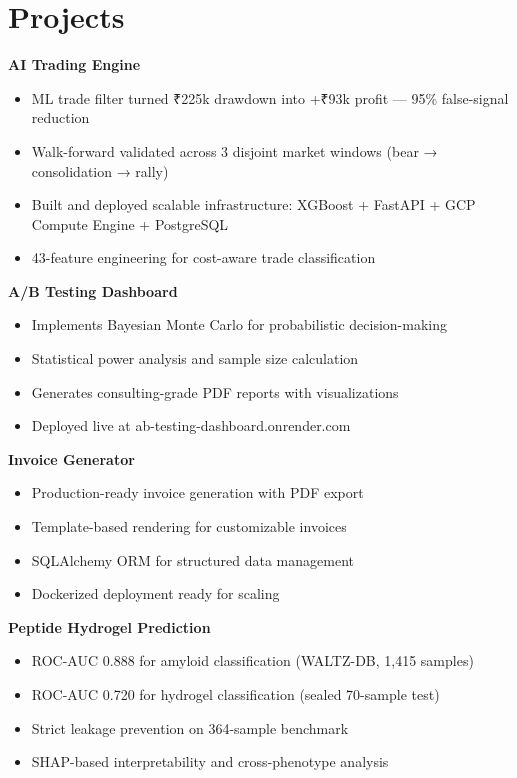 \documentclass[11pt,a4paper]{article}
\begin{document}
\section*{Projects}
\noindent\textbf{AI Trading Engine} \hfill \href{https://github.com/jiyanshusingh/trading-engine}{\faGithub}
\begin{itemize}
    \item ML trade filter turned ₹225k drawdown into +₹93k profit — 95\% false-signal reduction
    \item Walk-forward validated across 3 disjoint market windows (bear → consolidation → rally)
    \item Built and deployed scalable infrastructure: XGBoost + FastAPI + GCP Compute Engine + PostgreSQL
    \item 43-feature engineering for cost-aware trade classification
\end{itemize}

\noindent\textbf{A/B Testing Dashboard} \hfill \href{https://ab-testing-dashboard.onrender.com}{\faGlobe} \href{https://github.com/jiyanshusingh/ab-testing-dashboard}{\faGithub}
\begin{itemize}
    \item Implements Bayesian Monte Carlo for probabilistic decision-making
    \item Statistical power analysis and sample size calculation
    \item Generates consulting-grade PDF reports with visualizations
    \item Deployed live at ab-testing-dashboard.onrender.com
\end{itemize}

\noindent\textbf{Invoice Generator} \hfill \href{https://github.com/jiyanshusingh/invoice-generator}{\faGithub}
\begin{itemize}
    \item Production-ready invoice generation with PDF export
    \item Template-based rendering for customizable invoices
    \item SQLAlchemy ORM for structured data management
    \item Dockerized deployment ready for scaling
\end{itemize}

\noindent\textbf{Peptide Hydrogel Prediction} \hfill \href{https://peptide-hydrogel-portal.onrender.com}{\faGlobe} \href{https://github.com/jiyanshusingh/hydrogel_project}{\faGithub}
\begin{itemize}
    \item ROC-AUC 0.888 for amyloid classification (WALTZ-DB, 1,415 samples)
    \item ROC-AUC 0.720 for hydrogel classification (sealed 70-sample test)
    \item Strict leakage prevention on 364-sample benchmark
    \item SHAP-based interpretability and cross-phenotype analysis
\end{itemize}
\end{document}
